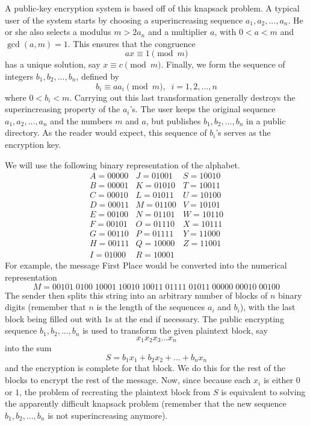 \documentclass{article}
\theoremstyle{remark}
\theoremstyle{definition}
\begin{document}
A public-key encryption system is based off of this knapsack problem. A typical user of the system starts by choosing a superincreasing sequence $a_1, a_2, ..., a_n$. He or she also selects a modulus $m > 2a_n$ and a multiplier $a$, with $0 < a < m$ and $\gcd(a, m) = 1$. This ensures that the congruence 
\[ax \equiv 1 \pmod{m}\]
has a unique solution, say $x \equiv c \pmod{m}$. Finally, we form the sequence of integers $b_1, b_2, ..., b_n$, defined by 
\[b_i \equiv a a_i \pmod{m}, \;\; i = 1, 2, ..., n\]
where $0 < b_i < m$. Carrying out this last transformation generally destroys the superincreasing property of the $a_i$'s. The user keeps the original sequence $a_1, a_2, ..., a_n$ and the numbers $m$ and $a$, but publishes $b_1, b_2, ..., b_n$ in a public directory. As the reader would expect, this sequence of $b_i$'s serves as the encryption key. 

We will use the following binary representation of the alphabet. 
\[\begin{array}{ccc}
    A = 00000 & J = 01001 & S = 10010 \\
    B = 00001 & K = 01010 & T = 10011 \\
    C = 00010 & L = 01011 & U = 10100 \\
    D = 00011 & M = 01100 & V = 10101 \\
    E = 00100 & N = 01101 & W = 10110 \\
    F = 00101 & O = 01110 & X = 10111 \\
    G = 00110 & P = 01111 & Y = 11000 \\
    H = 00111 & Q = 10000 & Z = 11001 \\
    I = 01000 & R = 10001
\end{array}\]
For example, the message First Place would be converted into the numerical representation 
\[M = 00101\;0100\;10001\;10010\;10011\;01111\;01011\;00000\;00010\;00100\]
The sender then splits this string into an arbitrary number of blocks of $n$ binary digits (remember that $n$ is the length of the sequences $a_i$ and $b_i$), with the last block being filled out with $1$s at the end if necessary. The public encrypting sequence $b_1, b_2, ..., b_n$ is used to transform the given plaintext block, say 
\[x_1 x_2 x_3 ... x_n\]
into the sum 
\[S = b_1 x_1 + b_2 x_2 + ... + b_n x_n\]
and the encryption is complete for that block. We do this for the rest of the blocks to encrypt the rest of the message. Now, since because each $x_i$ is either $0$ or $1$, the problem of recreating the plaintext block from $S$ is equivalent to solving the apparently difficult knapsack problem (remember that the new sequence $b_1, b_2, ..., b_n$ is not superincreasing anymore). 
\end{document}
